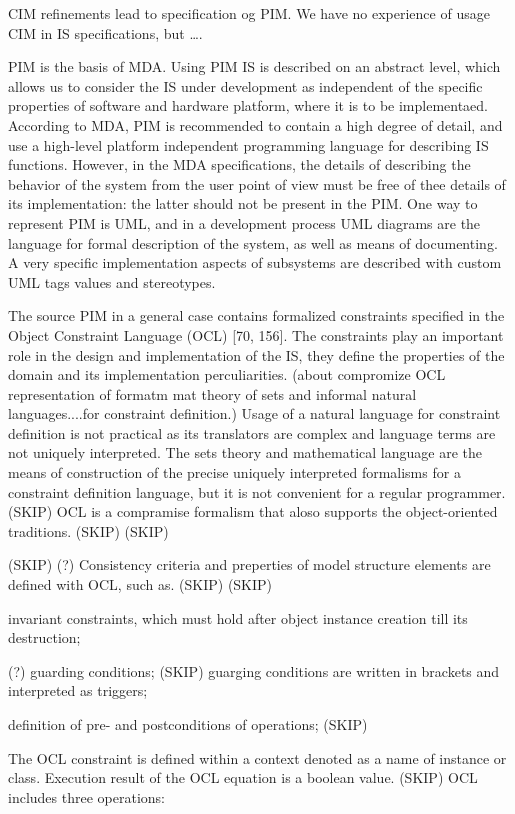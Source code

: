 \documentclass{intech}
\begin{document}
CIM refinements lead to specification og PIM. We have no experience of usage CIM in IS specifications, but \ldots.

PIM is the basis of MDA. Using PIM IS is described on an abstract level, which allows us to consider the IS under development as independent of the specific properties of software and hardware platform, where it is to be implementaed. According to MDA, PIM is recommended to contain a high degree of detail, and use a high-level platform independent programming language for describing IS functions. However, in the MDA specifications, the details of describing the behavior of the system from the user point of view must be free of thee details of its implementation: the latter should not be present in the PIM. One way to represent PIM is UML, and in a development process UML diagrams are the language for formal description of the system, as well as means of documenting. A very specific implementation aspects of subsystems are described with custom UML tags values and stereotypes.

The source PIM in a general case contains formalized constraints specified in the Object Constraint Language (OCL) [70, 156]. The constraints play an important role in the design and implementation of the IS, they define the properties of the domain and its implementation perculiarities. (about compromize OCL representation of formatm mat theory of sets and informal natural languages....for constraint definition.) Usage of a natural language for constraint definition is not practical as its translators are complex and language terms are not uniquely interpreted. The sets theory and mathematical language are the means of construction of the precise uniquely interpreted formalisms for a constraint definition language, but it is not convenient for a regular programmer. (SKIP) OCL is a compramise formalism that aloso supports the object-oriented traditions. (SKIP) (SKIP)

(SKIP) (?) Consistency criteria and preperties of model structure elements are defined with OCL, such as. (SKIP) (SKIP) 

invariant constraints, which must hold after object instance creation till its destruction;

(?) guarding conditions; (SKIP) guarging conditions are written in brackets and interpreted as triggers; 

definition of pre- and postconditions of operations; (SKIP)

 The OCL constraint is defined within a context denoted as a name of instance or class. Execution result of the OCL equation is a boolean value. (SKIP) OCL includes three operations:
\end{document}
